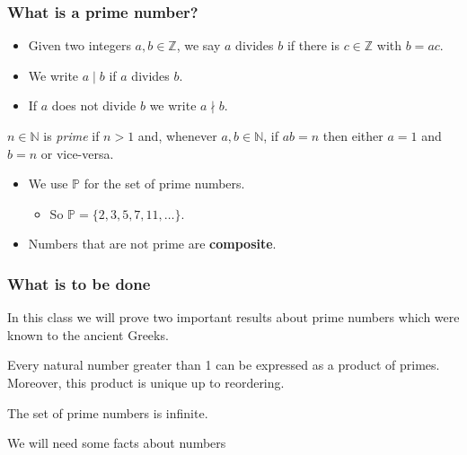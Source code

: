 \documentclass[handout]{beamer}
\newcommand{\bN}{\mathbb{N}}
\newcommand{\bZ}{\mathbb{Z}}
\newcommand{\bP}{\mathbb{P}}
\begin{document}
\begin{frame}
\frametitle{What is a prime number?}
\begin{itemize}
\item Given two integers $a,b\in \bZ$, we say $a$ divides $b$ if there is $c\in \bZ$ with $b=ac$. 
\vspace{0.3cm}
\item We write $a\mid b$ if $a$ divides $b$. 
\vspace{0.3cm}
\item If $a$ does not divide $b$ we write $a\nmid b$.
\end{itemize}

\begin{definition}
$n\in \bN$ is \emph{prime} if $n>1$ and, whenever $a,b\in \bN$, if $ab=n$ then either $a=1$ and $b= n$ or vice-versa.
\end{definition}

\begin{itemize}
\item We use $\bP$ for the set of prime numbers.
\begin{itemize} 
\item So $\bP=\{2,3,5,7,11,\ldots\}$.  
\end{itemize}
\item Numbers that are not prime are \textbf{composite}.
\end{itemize}

\end{frame}

\begin{frame}
\frametitle{What is to be done}
In this class we will prove two important results about prime numbers which were known to the ancient Greeks.
\vspace{0.5cm}
\begin{theorem}\label{T:fund}
Every natural number greater than 1 can be expressed as a product of primes. Moreover, this product is unique up to reordering.
\end{theorem}
\vspace{0.5cm}
\begin{theorem}\label{T:inf}
The set of prime numbers is infinite.
\end{theorem}
\vspace{0.5cm}
We will need some facts about numbers
\end{frame}
\end{document}
